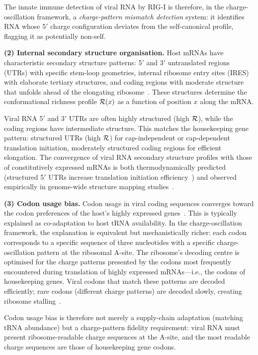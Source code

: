 The innate immune detection of viral RNA by RIG-I is therefore, in the charge-oscillation framework, a \emph{charge-pattern mismatch detection} system: it identifies RNA whose 5$'$ charge configuration deviates from the self-canonical profile, flagging it as potentially non-self.

\textbf{(2) Internal secondary structure organisation.}
Host mRNAs have characteristic secondary structure patterns: 5$'$ and 3$'$ untranslated regions (UTRs) with specific stem-loop geometries, internal ribosome entry sites (IRES) with elaborate tertiary structures, and coding regions with moderate structure that unfolds ahead of the elongating ribosome~\cite{Spitale2015,Incarnato2016}. These structures determine the conformational richness profile $\mathcal{R}(x)$ as a function of position $x$ along the mRNA.

Viral RNA 5$'$ and 3$'$ UTRs are often highly structured (high $\mathcal{R}$), while the coding regions have intermediate structure. This matches the housekeeping gene pattern: structured UTRs (high $\mathcal{R}$) for cap-independent or cap-dependent translation initiation, moderately structured coding regions for efficient elongation. The convergence of viral RNA secondary structure profiles with those of constitutively expressed mRNAs is both thermodynamically predicted (structured 5$'$ UTRs increase translation initiation efficiency~\cite{Kozak1989}) and observed empirically in genome-wide structure mapping studies~\cite{Watts2009,Huber2019}.

\textbf{(3) Codon usage bias.}
Codon usage in viral coding sequences converges toward the codon preferences of the host's highly expressed genes~\cite{Nakamura2000,Karlin2001}. This is typically explained as co-adaptation to host tRNA availability. In the charge-oscillation framework, the explanation is equivalent but mechanistically richer: each codon corresponds to a specific sequence of three nucleotides with a specific charge-oscillation pattern at the ribosomal A-site. The ribosome's decoding centre is optimised for the charge patterns presented by the codons most frequently encountered during translation of highly expressed mRNAs---i.e., the codons of housekeeping genes. Viral codons that match these patterns are decoded efficiently; rare codons (different charge patterns) are decoded slowly, creating ribosome stalling~\cite{Presnyak2015}.

Codon usage bias is therefore not merely a supply-chain adaptation (matching tRNA abundance) but a charge-pattern fidelity requirement: viral RNA must present ribosome-readable charge sequences at the A-site, and the most readable charge sequences are those of housekeeping gene codons.

